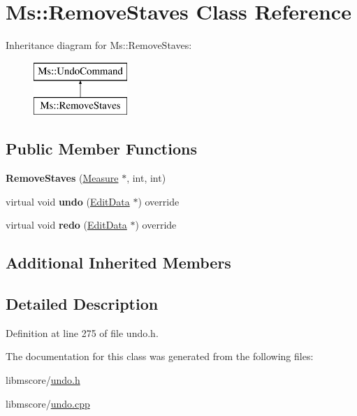\hypertarget{class_ms_1_1_remove_staves}{}\section{Ms\+:\+:Remove\+Staves Class Reference}
\label{class_ms_1_1_remove_staves}
Inheritance diagram for Ms\+:\+:Remove\+Staves\+:\begin{figure}[H]
\begin{center}
\leavevmode
\includegraphics[height=2.000000cm]{class_ms_1_1_remove_staves}
\end{center}
\end{figure}
\subsection*{Public Member Functions}
\begin{DoxyCompactItemize}
\item 
\mbox{\label{class_ms_1_1_remove_staves_a889cd3c14239eb001427fa4879b9a169}} 
{\bfseries Remove\+Staves} (\hyperlink{class_ms_1_1_measure}{Measure} $\ast$, int, int)
\item 
\mbox{\label{class_ms_1_1_remove_staves_a3375086725bd316d7200c563fcc87387}} 
virtual void {\bfseries undo} (\hyperlink{class_ms_1_1_edit_data}{Edit\+Data} $\ast$) override
\item 
\mbox{\label{class_ms_1_1_remove_staves_a4e2ad5343eb18425065e5edeb6750290}} 
virtual void {\bfseries redo} (\hyperlink{class_ms_1_1_edit_data}{Edit\+Data} $\ast$) override
\end{DoxyCompactItemize}
\subsection*{Additional Inherited Members}


\subsection{Detailed Description}


Definition at line 275 of file undo.\+h.



The documentation for this class was generated from the following files\+:\begin{DoxyCompactItemize}
\item 
libmscore/\hyperlink{undo_8h}{undo.\+h}\item 
libmscore/\hyperlink{undo_8cpp}{undo.\+cpp}\end{DoxyCompactItemize}
